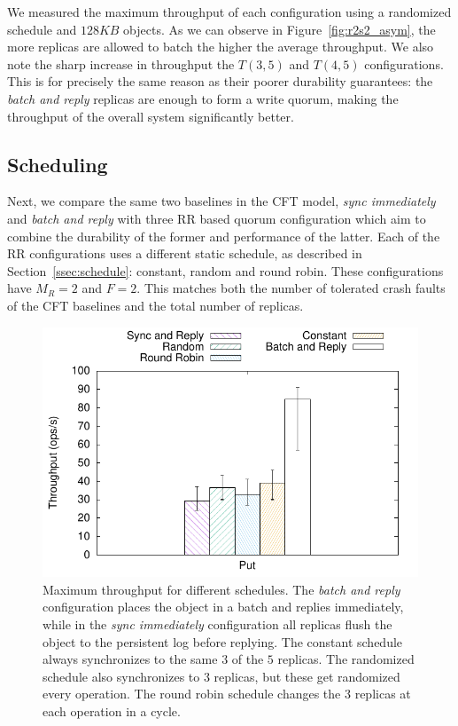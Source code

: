 We measured the maximum throughput of each configuration using a
randomized schedule and $128KB$ objects. As we can observe in
Figure~\ref{fig:r2s2_asym}, the more replicas are
allowed to batch the higher the average throughput. We also note
the sharp increase in throughput the $T(3, 5)$ and $T(4, 5)$
configurations. This is for precisely the same reason as their
poorer durability guarantees: the \emph{batch and reply} replicas
are enough to form a write quorum, making the throughput of the
overall system significantly better.


\subsection{Scheduling}\label{ssec:r2s2_eval_scheduling}

Next, we compare the same two baselines in the
\ac{CFT} model, \emph{sync immediately} and \emph{batch and reply} with three \ac{RR} based quorum
configuration which aim to combine the durability of the former and
performance of the latter. Each of the \ac{RR} configurations
uses a different static schedule, as described in
Section~\ref{ssec:schedule}: constant, random and round robin.
These configurations have $M_R = 2$ and $F = 2$. This matches
both the number of tolerated crash faults of the \ac{CFT}
baselines and the total number of replicas.


\begin{figure}[t]
    \centering
    \includegraphics[width=.75\linewidth]{r2s2_results/rr_small/tput.pdf}
    \caption{Maximum throughput for different schedules.
    The \emph{batch and reply} configuration places the
    object in a batch and replies immediately, while in the
    \emph{sync immediately} configuration all replicas
    flush the object to the persistent log before replying. The
    constant schedule always synchronizes to the same $3$ of the
    $5$ replicas. The randomized schedule also synchronizes to
    $3$ replicas, but these get randomized every operation. The
    round robin schedule changes the $3$ replicas at each
    operation in a cycle.}\label{fig:r2s2_sched}
\end{figure}

